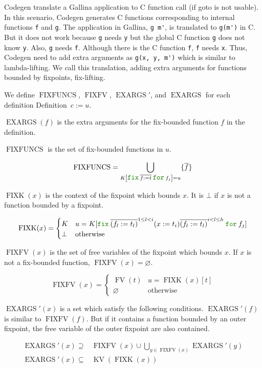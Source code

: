 \documentclass[a4paper,fleqn]{article}
\def\gallina{\textrm{Gallina}}
\def\codegen{\textrm{Codegen}}
\newcommand{\kwDefinition}{\mbox{\color{myviolet}\ttfamily Definition}}
\newcommand{\kwfix}{\mbox{\color{mygreen}\ttfamily fix}}
\newcommand{\kwfor}{\mbox{\color{mygreen}\ttfamily for}}
\newcommand{\ofix}[2]{\kwfix\:{#1}\:\kwfor\:{#2}}
\DeclareMathOperator{\FV}{FV}
\DeclareMathOperator{\KV}{KV}
\DeclareMathOperator{\FIXFUNCS}{FIXFUNCS}
\DeclareMathOperator{\FIXK}{FIXK}
\DeclareMathOperator{\FIXFV}{FIXFV}
\DeclareMathOperator{\EXARGS}{EXARGS}
\newcommand{\kwgoto}{\mbox{\color{myviolet}\ttfamily goto}}
\newcommand{\rep}[1]{\overline{#1}}
\newcommand{\repi}[2]{\overline{#1}^{#2}}
\begin{document}
\codegen{} translate a \gallina{} application to C function call (if \kwgoto{} is not usable).
In this scenario, \codegen{} generates C functions corresponding to internal functions \lstinline[style=Cstyle]!f! and \lstinline[style=Cstyle]!g!.
The application in \gallina{}, \lstinline!g m'!, is translated to \lstinline[style=Cstyle]!g(m')! in C.
But it does not work because \lstinline!g! needs \lstinline!y! but the global C function \lstinline[style=Cstyle]!g! does not know \lstinline!y!.
Also, \lstinline!g! needs \lstinline!f!.
Although there is the C function \lstinline!f!, \lstinline!f! needs \lstinline!x!.
Thus, \codegen{} need to add extra arguments as \lstinline[style=Cstyle]!g(x, y, m')! which is similar to lambda-lifting.
We call this translation, adding extra arguments for functions bounded by fixpoints, fix-lifting.

We define $\FIXFUNCS$, $\FIXFV$, $\EXARGS'$, and $\EXARGS$ for each definition \kwDefinition~$c := u$.

$\EXARGS(f)$ is the extra arguments for the fix-bounded function $f$ in the definition.

$\FIXFUNCS$ is the set of fix-bounded functions in $u$.

\[
  \FIXFUNCS = \bigcup_{K\left[\ofix{\rep{f:=t}}{f_j}\right] = u} \{\rep{f}\}
\]

$\FIXK(x)$ is the context of the fixpoint which bounds $x$.
It is $\bot$ if $x$ is not a function bounded by a fixpoint.

\[
  \FIXK(x) =
  \begin{cases}
    K & u = K[\ofix{\repi{(f_l:=t_l)}{1\leq l < i} (x:=t_i) \repi{(f_l:=t_l)}{i < l \leq h}}{f_j}]  \\
    \bot & \text{otherwise}
  \end{cases}
\]

$\FIXFV(x)$ is the set of free variables of the fixpoint which bounds $x$.
If $x$ is not a fix-bounded function, $\FIXFV(x)=\varnothing$.

\[
  \FIXFV(x) =
  \begin{cases}
    \FV(t) & u = \FIXK(x)[t]  \\
    \varnothing & \text{otherwise}
  \end{cases}
\]

$\EXARGS'(x)$ is a set which satisfy the following conditions.
$\EXARGS'(f)$ is similar to $\FIXFV(f)$.
But if it contains a function bounded by an outer fixpoint, the free variable of the outer fixpoint are also contained.

\begin{align*}
  \EXARGS'(x) \supseteq& \FIXFV(x) \cup \bigcup_{y \in \FIXFV(x)} \EXARGS'(y) \\
  \EXARGS'(x) \subseteq& \KV(\FIXK(x))
\end{align*}
\end{document}
